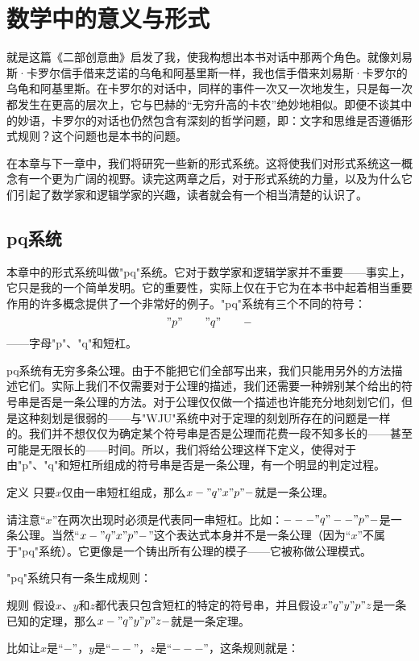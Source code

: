 
\chapter{数学中的意义与形式}

就是这篇《二部创意曲》启发了我，使我构想出本书对话中那两个角色。就像刘易斯·卡罗尔信手借来芝诺的乌龟和阿基里斯一样，我也信手借来刘易斯·卡罗尔的乌龟和阿基里斯。在卡罗尔的对话中，同样的事件一次又一次地发生，只是每一次都发生在更高的层次上，它与巴赫的“无穷升高的卡农”绝妙地相似。即便不谈其中的妙语，卡罗尔的对话也仍然包含有深刻的哲学问题，即：文字和思维是否遵循形式规则？这个问题也是本书的问题。

在本章与下一章中，我们将研究一些新的形式系统。这将使我们对形式系统这一概念有一个更为广阔的视野。读完这两章之后，对于形式系统的力量，以及为什么它们引起了数学家和逻辑学家的兴趣，读者就会有一个相当清楚的认识了。

\section{pq系统}

本章中的形式系统叫做"pq"系统。它对于数学家和逻辑学家并不重要——事实上，它只是我的一个简单发明。它的重要性，实际上仅在于它为在本书中起着相当重要作用的许多概念提供了一个非常好的例子。"pq"系统有三个不同的符号：
\[
  "p" \qquad "q" \qquad -
\]
——字母"p"、"q"和短杠。

pq系统有无穷多条公理。由于不能把它们全部写出来，我们只能用另外的方法描述它们。实际上我们不仅需要对于公理的描述，我们还需要一种辨别某个给出的符号串是否是一条公理的方法。对于公理仅仅做一个描述也许能充分地刻划它们，但是这种刻划是很弱的——与"WJU"系统中对于定理的刻划所存在的问题是一样的。我们并不想仅仅为确定某个符号串是否是公理而花费一段不知多长的——甚至可能是无限长的——时间。所以，我们将给公理这样下定义，使得对于由"p"、"q"和短杠所组成的符号串是否是一条公理，有一个明显的判定过程。

\begin{thm}{定义}
只要$x$仅由一串短杠组成，那么$x-"q"x"p"-$就是一条公理。
\end{thm}
请注意“$x$”在两次出现时必须是代表同一串短杠。比如：$---"q"--"p"-$是一条公理。当然“$x-"q"x"p"-$”这个表达式本身并不是一条公理（因为“$x$”不属于"pq"系统）。它更像是一个铸出所有公理的模子——它被称做公理模式。

"pq"系统只有一条生成规则：

\begin{thm}{规则}
假设$x$、$y$和$z$都代表只包含短杠的特定的符号串，并且假设$x"q"y"p"z$是一条已知的定理，那么$x-"q"y"p"z-$就是一条定理。
\end{thm}
比如让$x$是“$-$”，$y$是“$--$”，$z$是“$---$”，这条规则就是：

